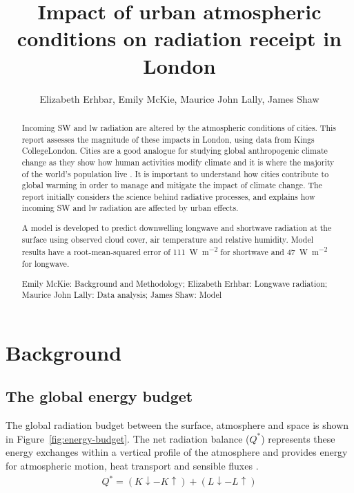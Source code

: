 \documentclass[a4paper,titlepage, twoside]{report}
\newcommand\Kdown{K\!\!\downarrow}
\newcommand\Kup{K\!\!\uparrow}
\newcommand\Ldown{L\!\!\downarrow}
\newcommand\Lup{L\!\!\uparrow}
\begin{document}
\expandafter\def\csname PY@tok@err\endcsname{}

\title{Impact of urban atmospheric conditions on radiation receipt in London}
\author{Elizabeth Erhbar, Emily McKie, Maurice John Lally, James Shaw}
\maketitle

\begin{abstract}
Incoming SW and lw radiation are altered by the atmospheric conditions of cities. This report assesses the magnitude of these impacts in London, using data from Kings CollegeLondon. Cities are a good analogue for studying global anthropogenic climate change as they show how human activities modify climate and it is where the majority of the world's population live \parencite{cleugh}. It is important to understand how cities contribute to global warming in order to manage and mitigate the impact of climate change. The report initially considers the science behind radiative processes, and explains how incoming SW and lw radiation are affected by urban effects.

A model is developed to predict downwelling longwave and shortwave radiation at the surface using observed cloud cover, air temperature and relative humidity.  Model results have a root-mean-squared error of \SI{111}{\watt\per\meter\squared} for shortwave and \SI{47}{\watt\per\meter\squared} for longwave.

\vspace{4em}
Emily McKie: Background and Methodology; Elizabeth Erhbar: Longwave radiation; Maurice John Lally: Data analysis; James Shaw: Model
\end{abstract}

\tableofcontents

\chapter{Background}
\section{The global energy budget}
The global radiation budget between the surface, atmosphere and space is shown in Figure~\ref{fig:energy-budget}.  The net radiation balance ($Q^\ast$) represents these energy exchanges within a vertical profile of the atmosphere and provides energy for atmospheric motion, heat transport and sensible fluxes \parencite{offerle}.
\begin{align}
Q^\ast = \left( \Kdown - \Kup \right) + \left( \Ldown - \Lup \right)
\end{align}
\end{document}
